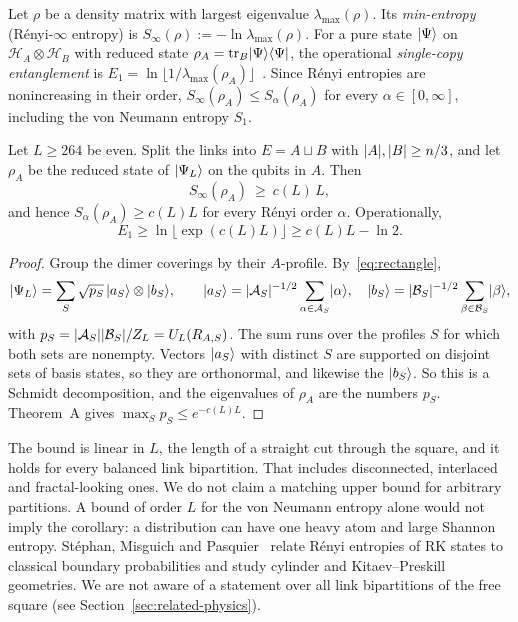 \begin{definition}
Let $\rho$ be a density matrix with largest eigenvalue $\lambda_{\max}(\rho)$. Its \emph{min-entropy} (R\'enyi-$\infty$ entropy) is $S_\infty(\rho):=-\ln\lambda_{\max}(\rho)$. For a pure state $\lvert \Psi\rangle$ on $\mathcal H_A\otimes\mathcal H_B$ with reduced state $\rho_A=\operatorname{tr}_B\lvert \Psi\rangle\langle \Psi\rvert$, the operational \emph{single-copy entanglement} is $E_1=\ln\lfloor1/\lambda_{\max}(\rho_A)\rfloor$~\cite{EisertCramer05}. Since R\'enyi entropies are nonincreasing in their order, $S_\infty(\rho_A)\le S_\alpha(\rho_A)$ for every $\alpha\in[0,\infty]$, including the von Neumann entropy $S_1$.
\end{definition}

\begin{corollary}\label{cor:entanglement}
Let $L\ge264$ be even. Split the links into $E=A\sqcup B$ with $\lvert A\rvert,\lvert B\rvert\ge n/3$, and let $\rho_A$ be the reduced state of $\lvert \Psi_L\rangle$ on the qubits in $A$. Then
\[
  S_\infty(\rho_A)\ \ge\ c(L)\,L ,
\]
and hence $S_\alpha(\rho_A)\ge c(L)L$ for every R\'enyi order $\alpha$. Operationally,
\[
  E_1\ge\ln\lfloor\exp(c(L)L)\rfloor\ge c(L)L-\ln2.
\]
\end{corollary}

\begin{proof}
Group the dimer coverings by their $A$-profile. By~\eqref{eq:rectangle},
\[
  \lvert \Psi_L\rangle=\sum_S\sqrt{p_S}\,\lvert a_S\rangle\otimes\lvert b_S\rangle,\qquad
  \lvert a_S\rangle=\lvert \mathcal{A}_S\rvert^{-1/2}\sum_{\alpha\in\mathcal{A}_S}\lvert \alpha\rangle,\quad
  \lvert b_S\rangle=\lvert \mathcal{B}_S\rvert^{-1/2}\sum_{\beta\in\mathcal{B}_S}\lvert \beta\rangle,
\]
with $p_S=\lvert \mathcal{A}_S\rvert\lvert \mathcal{B}_S\rvert/Z_L=U_L(R_{A,S})$. The sum runs over the profiles $S$ for which both sets are nonempty. Vectors $\lvert a_S\rangle$ with distinct $S$ are supported on disjoint sets of basis states, so they are orthonormal, and likewise the $\lvert b_S\rangle$. So this is a Schmidt decomposition, and the eigenvalues of $\rho_A$ are the numbers $p_S$. Theorem~A gives $\max_Sp_S\le e^{-c(L)L}$.
\end{proof}

The bound is linear in $L$, the length of a straight cut through the square, and it holds for every balanced link bipartition. That includes disconnected, interlaced and fractal-looking ones. We do not claim a matching upper bound for arbitrary partitions. A bound of order $L$ for the von Neumann entropy alone would not imply the corollary: a distribution can have one heavy atom and large Shannon entropy. Stéphan, Misguich and Pasquier~\cite{StephanMisguichPasquier12} relate R\'enyi entropies of RK states to classical boundary probabilities and study cylinder and Kitaev--Preskill geometries. We are not aware of a statement over all link bipartitions of the free square (see Section~\ref{sec:related-physics}).

